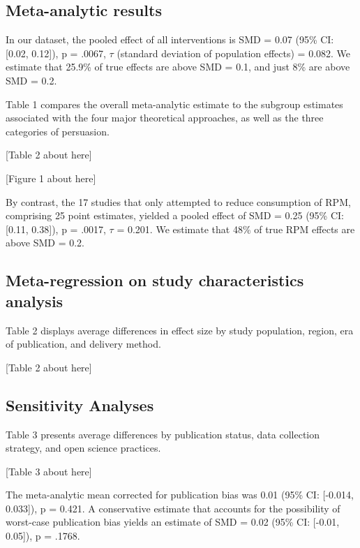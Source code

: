 \documentclass[sn-nature,referee,pdflatex]{sn-jnl}
\begin{document}
\subsection{Meta-analytic results}\label{sec2.3}

In our dataset, the pooled effect of all interventions is SMD = 0.07
(95\% CI: {[}0.02, 0.12{]}), p = .0067, \(\tau\) (standard deviation of
population effects) = 0.082. We estimate that 25.9\% of true effects are
above SMD = 0.1, and just 8\% are above SMD = 0.2.

Table 1 compares the overall meta-analytic estimate to the subgroup
estimates associated with the four major theoretical approaches, as well
as the three categories of persuasion.

\begin{center}
[Table 2 about here]
\end{center}
\begin{center}
[Figure 1 about here]
\end{center}

By contrast, the 17 studies that only attempted to reduce consumption of
RPM, comprising 25 point estimates, yielded a pooled effect of SMD =
0.25 (95\% CI: {[}0.11, 0.38{]}), p = .0017, \(\tau\) = 0.201. We
estimate that 48\% of true RPM effects are above SMD = 0.2.

\subsection{Meta-regression on study characteristics
analysis}\label{sec2.4}

Table 2 displays average differences in effect size by study population,
region, era of publication, and delivery method.

\begin{center}
[Table 2 about here]
\end{center}

\subsection{Sensitivity Analyses}\label{sec2.5}

Table 3 presents average differences by publication status, data
collection strategy, and open science practices.

\begin{center}
[Table 3 about here]
\end{center}

The meta-analytic mean corrected for publication bias \citep{hedges1992}
was 0.01 (95\% CI: {[}-0.014, 0.033{]}), p = 0.421. A conservative
estimate that accounts for the possibility of worst-case publication
bias \citep{mathur2024} yields an estimate of SMD = 0.02 (95\% CI:
{[}-0.01, 0.05{]}), p = .1768.
\end{document}
